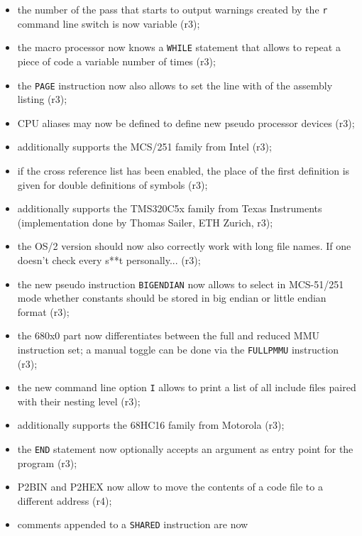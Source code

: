 \documentclass[12pt,twoside]{report}
\newcommand{\tty}[1]{{\tt #1}}
\begin{document}
\begin{itemize}
{\begin{itemize}
      \item{the number of the pass that starts to output warnings
            created by the \tty{r} command line switch is now variable
            (r3);}
      \item{the macro processor now knows a \tty{WHILE} statement that
            allows to repeat a piece of code a variable number of
            times (r3);}
      \item{the \tty{PAGE} instruction now also allows to set the line
            with of the assembly listing (r3);}
      \item{CPU aliases may now be defined to define new pseudo
            processor devices (r3);}
      \item{additionally supports the MCS/251 family from Intel
            (r3);}
      \item{if the cross reference list has been enabled, the
            place of the first definition is given for double
            definitions of symbols (r3);}
      \item{additionally supports the TMS320C5x family from Texas
            Instruments (implementation done by Thomas Sailer,
            ETH Zurich, r3);}
      \item{the OS/2 version should now also correctly work with
            long file names.  If one doesn't check every s**t
            personally... (r3);}
      \item{the new pseudo instruction \tty{BIGENDIAN} now allows to
            select in MCS-51/251 mode whether constants should
            be stored in big endian or little endian format (r3);}
      \item{the 680x0 part now differentiates between the full
            and reduced MMU instruction set; a manual toggle can
            be done via the \tty{FULLPMMU} instruction (r3);}
      \item{the new command line option \tty{I} allows to print a list
            of all include files paired with their nesting level
            (r3);}
      \item{additionally supports the 68HC16 family from Motorola
            (r3);}
      \item{the \tty{END} statement now optionally accepts an argument
            as entry point for the program (r3);}
      \item{P2BIN and P2HEX now allow to move the contents of a
            code file to a different address (r4);}
      \item{comments appended to a \tty{SHARED} instruction are now
}
\end{itemize}}
\end{itemize}
\end{document}

